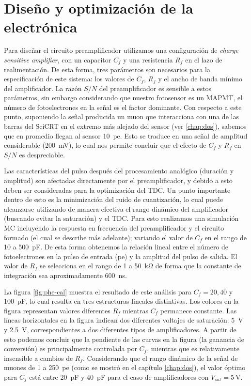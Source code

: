 \section{Diseño y optimización de la electrónica}

Para diseñar el circuito preamplificador utilizamos una configuración de \emph{charge sensitive amplifier}, con un capacitor $C_{f}$ y una resistencia $R_{f}$ en el lazo de realimentación. De esta forma, tres parámetros son necesarios para la especificación de este sistema: los valores de $C_{f}$, $R_{f}$ y el ancho de banda mínimo del amplificador. La razón $S/N$ del preamplificador es sensible a estos parámetros, sin embargo considerando que nuestro fotosensor es un MAPMT, el número de fotoelectrones en la señal es el factor dominante. Con respecto a este punto, suponiendo la señal producida un muon que interacciona con una de las barras del SciCRT en el extremo más alejado del sensor (ver \ref{chap:dos}), sabemos que en promedio llegan al sensor \SI{10}{pe}. Esto se traduce en una señal de amplitud considerable (\SI{200}{\milli\volt}), lo cual nos permite concluir que el efecto de $C_{f}$ y $R_{f}$ en $S/N$ es despreciable.

Las características del pulso después del procesamiento analógico (duración y amplitud) son afectadas directamente por el preamplificador, y debido a esto deben ser consideradas para la optimización del TDC. Un punto importante dentro de esto es la minimización del ruido de cuantización, lo cual puede alcanzarse utilizando de manera efectiva el rango dinámico del amplificador (buscando evitar la saturación) y el TDC. Para esto realizamos una simulación MC incluyendo la respuesta en frecuencia del preamplificador y el circuito formado (el cual se describe más adelante); variando el valor de $C_{f}$ en el rango de \num{10} a \SI{500}{\pico\farad}. De esta forma obtenemos la relación lineal entre el número de fotoelectrones en la pulso de entrada (\si{pe}) y la amplitud del pulso de salida. El valor de $R_{f}$ se selecciona en el rango de \num{1} a \SI{50}{\kilo\ohm} de forma que la constante de integración sea aproximadamente \SI{600}{\ns}.

La figura \ref{fig:phe-cal} muestra el resultado de este análisis para $C_ {f}=20,40$ y \SI{100}{\pico\farad}, lo cual resulta en tres estructuras lineales distintivas. Los colores en la figura representan valores diferentes $R_{f}$ mientras $C_{f}$ permanece constante. Las líneas horizontales en la figura indican dos diferentes voltajes de saturación: \SI{5}{\volt} y \SI{2.5}{\volt}, correspondientes a dos diferentes tipos de amplificadores. A partir de esto podemos concluir que la pendiente de las curvas en la figura (la ganancia de conversión) es principalmente controlada por $C_{f}$, mientras que es relativamente insensible a cambios de $R_{f}$. Considerando que el rango dinámico de la señal de muones de \num{1} a \SI{250}{pe} (como se mostró en el capítulo \ref{chap:dos}), el valor óptimo para $C_{f}$ está entre \SI{20}{\pico\farad} y \SI{40}{\pico\farad} para el caso de amplificadores con $V_{sat}=\SI{5}{\volt}$.

